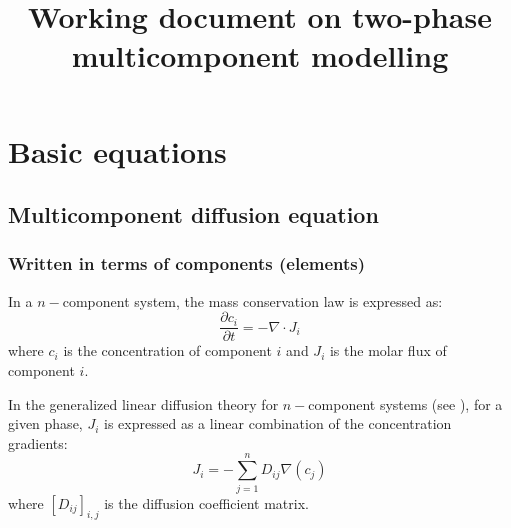 \documentclass[3p]{elsarticle}
\newcommand{\grad}[1]{\nabla #1}
\renewcommand{\div}[1]{\nabla \cdot #1}
\newcommand{\MatrixIJ}[3]{\left[#1\right]_{#2,#3}}
\newenvironment{abstracts}
 {\global\setbox\absbox=\vbox\bgroup
    \hsize=\textwidth
    \linespread{1}\selectfont}
 {\vspace{-\bigskipamount}\egroup}
\renewenvironment{abstract}[1][]
 {\if\relax\detokenize{#1}\relax\else\selectlanguage{#1}\fi
  \noindent\textbf{\abstractname}\par\medskip\noindent\ignorespaces}
 {\par\bigskip}
\begin{document}
\begin{frontmatter}

\title{Working document on two-phase multicomponent modelling}
% 
% 
  
% 
  
\end{frontmatter}

\section{Basic equations}

\subsection{Multicomponent diffusion equation}

\subsubsection{Written in terms of components (elements)}

In a $n-$component system, the mass conservation law is expressed as:
\begin{equation}
 \frac{\partial c_i}{\partial t} = -\div{J_i} \label{eq:ci}
\end{equation}
where $c_i$ is the concentration of component $i$ and $J_i$ is the molar flux of component $i$.

In the generalized linear diffusion theory for $n-$component systems (see \cite{Andersson1992}), for a given phase, $J_i$ is expressed as a linear combination of the concentration gradients:
\begin{equation}
J_i = - \sum_{j=1}^n D_{ij} \grad(c_j) \label{eq:Ji}
\end{equation}
where $\MatrixIJ{D_{ij}}{i}{j}$ is the diffusion coefficient matrix.
\end{document}
